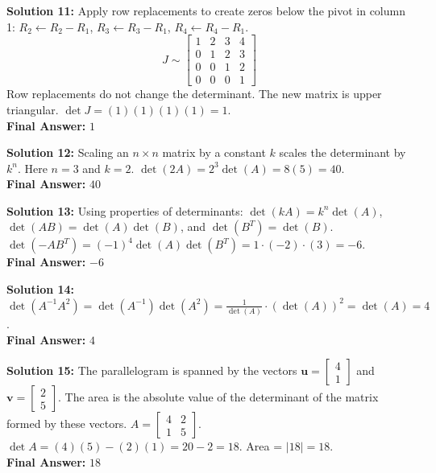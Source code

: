 \documentclass[11pt]{article}
\begin{document}
\vspace{0.5cm}
\textbf{Solution 11:}
Apply row replacements to create zeros below the pivot in column 1:
$R_2 \leftarrow R_2 - R_1$, $R_3 \leftarrow R_3 - R_1$, $R_4 \leftarrow R_4 - R_1$.
$$J \sim \begin{bmatrix} 1 & 2 & 3 & 4 \\ 0 & 1 & 2 & 3 \\ 0 & 0 & 1 & 2 \\ 0 & 0 & 0 & 1 \end{bmatrix}$$
Row replacements do not change the determinant. The new matrix is upper triangular.
$\det J = (1)(1)(1)(1) = 1$. \\
\textbf{Final Answer:} $1$

\vspace{0.5cm}
\textbf{Solution 12:}
Scaling an $n \times n$ matrix by a constant $k$ scales the determinant by $k^n$. Here $n=3$ and $k=2$.
$\det(2A) = 2^3 \det(A) = 8(5) = 40$. \\
\textbf{Final Answer:} $40$

\vspace{0.5cm}
\textbf{Solution 13:}
Using properties of determinants: $\det(kA) = k^n \det(A)$, $\det(AB) = \det(A)\det(B)$, and $\det(B^T) = \det(B)$.
$\det(-A B^T) = (-1)^4 \det(A) \det(B^T) = 1 \cdot (-2) \cdot (3) = -6$. \\
\textbf{Final Answer:} $-6$

\vspace{0.5cm}
\textbf{Solution 14:}
$\det(A^{-1} A^2) = \det(A^{-1}) \det(A^2) = \frac{1}{\det(A)} \cdot (\det(A))^2 = \det(A) = 4$. \\
\textbf{Final Answer:} $4$

\vspace{0.5cm}
\textbf{Solution 15:}
The parallelogram is spanned by the vectors $\mathbf{u} = \begin{bmatrix} 4 \\ 1 \end{bmatrix}$ and $\mathbf{v} = \begin{bmatrix} 2 \\ 5 \end{bmatrix}$.
The area is the absolute value of the determinant of the matrix formed by these vectors.
$A = \begin{bmatrix} 4 & 2 \\ 1 & 5 \end{bmatrix}$. $\det A = (4)(5) - (2)(1) = 20 - 2 = 18$.
Area = $|18| = 18$. \\
\textbf{Final Answer:} $18$
\end{document}
